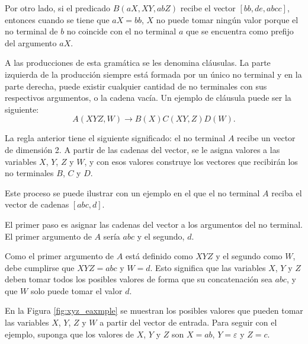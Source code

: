\documentclass[12pt]{article}
\begin{document}
Por otro lado, si el predicado $B(aX, XY, abZ)$ recibe el vector $[bb,de,abcc]$, entonces cuando se tiene que $aX=bb$,
$X$ no puede tomar ningún valor porque el no terminal de $b$ no coincide con el no terminal $a$ que se encuentra como 
prefijo del argumento $aX$.

A las producciones de esta gramática se les denomina cláusulas. La parte izquierda de la producción 
siempre está formada por un único no terminal y en la parte derecha, puede existir cualquier cantidad de no terminales 
con sus respectivos argumentos, o la cadena vacía. Un ejemplo de cláusula puede ser la siguiente:
$$A(XYZ,W)\to B(X)C(XY,Z)D(W).$$

La regla anterior tiene el siguiente significado: el no terminal $A$ recibe un vector de dimensión 2. A partir 
de las cadenas del vector, se le asigna valores a las variables $X$, $Y$, $Z$ y $W$, y con esos valores 
construye los vectores que recibirán los no terminales $B$, $C$ y $D$.

Este proceso se puede ilustrar con un ejemplo en el que el no terminal $A$ reciba el vector de cadenas $[abc, d]$.

El primer paso es asignar las cadenas del vector a los argumentos del no terminal. El primer argumento de $A$ sería $abc$ y el segundo, $d$.

Como el primer argumento de $A$ está definido como $XYZ$ y el segundo como $W$, debe cumplirse que $XYZ=abc$ y $W=d$. Esto significa que las variables $X$, $Y$ y $Z$ deben tomar todos los posibles valores de forma que su concatenación sea $abc$, y que $W$ solo puede tomar el valor $d$.

En la Figura \ref{fig:xyz_eaxmple} se muestran los posibles valores que pueden tomar las variables $X$, $Y$, $Z$ y $W$ a partir del vector de entrada. Para seguir con el ejemplo, suponga que los valores de $X$, $Y$ y $Z$ son $X=ab$, $Y=\varepsilon$ y $Z=c$.
\end{document}
